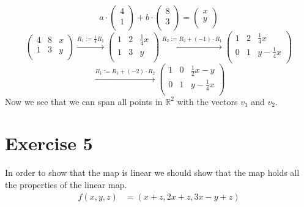 \documentclass[a4paper]{article}
\begin{document}
\[
a \cdot
\left(
\begin{array}{c}
4 \\
1 \\
\end{array}
\right)
+ b \cdot
\left(
\begin{array}{c}
8 \\
3 \\
\end{array}
\right)
=
\left(
\begin{array}{c}
x \\
y \\
\end{array}
\right)
\]
\[
\left(
\begin{array}{cc|c}
4 & 8 & x \\
1 & 3 & y \\
\end{array}
\right)
\xrightarrow{\text{$R_1 := \frac{1}{4} R_1$}}
\left(
\begin{array}{cc|c}
1 & 2 & \frac{1}{4} x \\
1 & 3 & y \\
\end{array}
\right)
\xrightarrow{\text{$R_2 := R_2 + (-1) \cdot R_1$}}
\left(
\begin{array}{cc|c}
1 & 2 & \frac{1}{4} x \\
0 & 1 & y - \frac{1}{4} x \\
\end{array}
\right)
\]
\[
\xrightarrow{\text{$R_1 := R_1 + (-2) \cdot R_2$}}
\left(
\begin{array}{cc|c}
1 & 0 & \frac{1}{2} x - y\\
0 & 1 & y - \frac{1}{4} x \\
\end{array}
\right)
\]
Now we see that we can span all points in $\mathbb{R}^2$ with the vectors $v_1$ and $v_2$.

\section*{Exercise 5}
 In order to show that the map is linear we should show that the map holds all the properties of the linear map.
\begin{align*}
 f(x, y, z) &= (x + z, 2x + z, 3x - y + z)
\end{align*}
\end{document}
